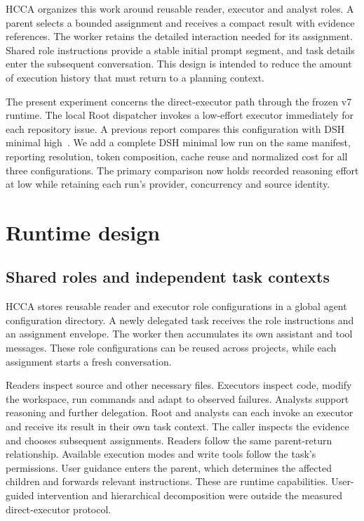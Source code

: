 \documentclass[10pt,a4paper]{article}
\begin{document}
HCCA organizes this work around reusable reader, executor and analyst roles.
A parent selects a bounded assignment and receives a compact result with
evidence references. The worker retains the detailed interaction needed for its
assignment. Shared role instructions provide a stable initial prompt segment,
and task details enter the subsequent conversation. This design is intended to
reduce the amount of execution history that must return to a planning context.

The present experiment concerns the direct-executor path through the frozen v7
runtime. The local Root dispatcher invokes a low-effort executor immediately
for each repository issue. A previous report compares this configuration with
DSH minimal high~\cite{historical}. We add a complete DSH minimal low run on the
same manifest, reporting resolution, token composition, cache reuse and
normalized cost for all three configurations. The primary comparison now
holds recorded reasoning effort at low while retaining each run's provider,
concurrency and source identity.

\section{Runtime design}

\subsection{Shared roles and independent task contexts}

HCCA stores reusable reader and executor role configurations in a global agent
configuration directory. A newly delegated task receives the role instructions
and an assignment envelope. The worker then accumulates its own assistant and
tool messages. These role configurations can be reused across projects, while
each assignment starts a fresh conversation.

Readers inspect source and other necessary files. Executors inspect code,
modify the workspace, run commands and adapt to observed failures. Analysts
support reasoning and further delegation. Root and analysts can each invoke
an executor and receive its result in their own task context. The caller
inspects the evidence and chooses subsequent assignments. Readers follow the
same parent-return relationship. Available execution modes and write tools
follow the task's permissions. User guidance enters the parent,
which determines the affected children and forwards relevant instructions.
These are runtime capabilities. User-guided intervention and hierarchical
decomposition were outside the measured direct-executor protocol.
\end{document}
